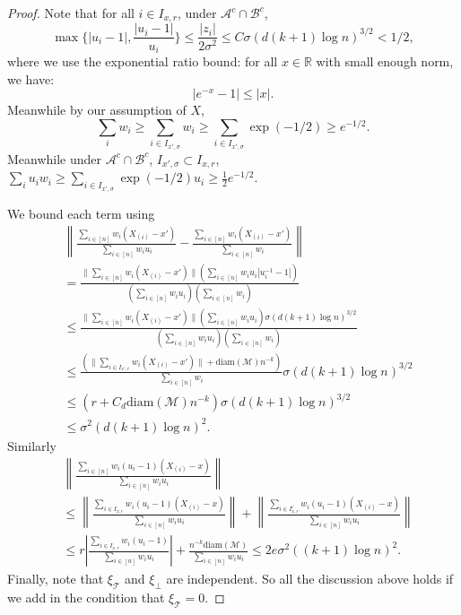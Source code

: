 \documentclass{article}
\def\calM{\mathcal{M}}
\begin{document}
\begin{proof}
Note that for all $i\in I_{x,r}$, under $\mathcal{A}^c\cap \mathcal{B}^c$, 
\[
\max\{|u_i-1|,\frac{|u_i-1|}{u_i}\}\leq \frac{|z_i|}{2\sigma^2}\leq C\sigma (d(k+1)\log n)^{3/2}<1/2,
\]
where we use the exponential ratio bound: 
for all \( x \in \mathbb{R} \) with small enough norm, we have:
\[
\left| e^{-x} - 1 \right| \le |x|.
\]
Meanwhile by our assumption of $X$,
\[
\sum_{i}w_i\geq  \sum_{i\in I_{x',\sigma}}w_i\geq 
\sum_{i\in I_{x',\sigma}}\exp(-1/2)
\geq e^{-1/2}.
\]
Meanwhile under $\mathcal{A}^c\cap \mathcal{B}^c$, $I_{x',\sigma}\subset I_{x,r}$, $\sum_i u_i w_i\geq 
\sum_{i\in I_{x',\sigma}}\exp(-1/2) u_i\geq \frac12 e^{-1/2}$. 

We bound each term using 
\begin{align*}
&\left\|\frac{\sum_{i\in [n]} w_i (X_{(i)}-x')}{\sum_{i\in [n]} w_iu_i}-\frac{\sum_{i\in [n]} w_i(X_{(i)}-x')}{\sum_{i\in [n]} w_i}\right\|\\
&=\frac{\|\sum_{i\in [n]} w_i (X_{(i)}-x')\|(\sum_{i\in [n]}w_i u_i|u_i^{-1}-1|)}{(\sum_{i\in [n]}w_i u_i)(\sum_{i\in [n]}w_i)}\\
&\leq \frac{\|\sum_{i\in [n]} w_i (X_{(i)}-x')\|(\sum_{i\in [n]}w_iu_i)\sigma (d(k+1)\log n)^{3/2}}{(\sum_{i\in [n]}w_i u_i)(\sum_{i\in [n]}w_i)}\\
&\leq \frac{(\|\sum_{i\in I_{x',r}} w_i (X_{(i)}-x')\|+\text{diam}(\calM)n^{-k})}{\sum_{i\in [n]}w_i}\sigma (d(k+1)\log n)^{3/2}\\
&\leq \left(r+C_d\text{diam}(\calM)n^{-k}\right)\sigma (d(k+1)\log n)^{3/2}\\
&\leq \sigma^2  (d(k+1)\log n)^2. 
\end{align*}
Similarly
\begin{align*}
&\left\|\frac{\sum_{i\in [n]} w_i(u_i-1) (X_{(i)}-x)}{\sum_{i\in [n]} w_iu_i}\right\|\\
&\leq \left\|\frac{\sum_{i\in I_{x,r}} w_i(u_i-1) (X_{(i)}-x)}{\sum_{i\in [n]} w_iu_i}\right\|+\left\|\frac{\sum_{i\in I^c_{x,r}} w_i(u_i-1) (X_{(i)}-x)}{\sum_{i\in [n]} w_iu_i}\right\|\\
&\leq r\left|\frac{\sum_{i\in I_{x,r}} w_i(u_i-1) }{\sum_{i\in [n]} w_iu_i}\right|+\frac{n^{-k}\text{diam}(\calM)}{\sum_{i\in [n]} w_iu_i}\leq 2e\sigma^2  ((k+1)\log n)^2.
\end{align*}
Finally, note that $\xi_{\mathcal{T}}$ and $\xi_\bot$ are independent. So all the discussion above holds if we add in the condition that $\xi_{\mathcal{T}}=0$. 
\end{proof}
\end{document}
